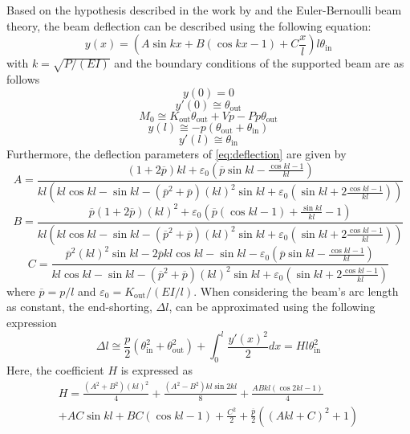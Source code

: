 Based on the hypothesis described in the work by \cite{tivot2021} and the Euler-Bernoulli beam theory, the beam deflection can be described using the following equation:
\begin{equation}\label{eq:deflection}
  y(x) = \left(A\sin{kx}+B(\cos{kx}-1)+C\frac{x}{l}\right) l {\theta }_\textrm{in}
\end{equation}
with $k=\sqrt{P/(EI)}$ and the boundary conditions of the supported beam are as follows
\[y(0)=0\]
\[y'(0)\cong{\theta }_\textrm{out}\]
\[M_0\cong K_\textrm{out}\theta_\textrm{out}+Vp-Pp\theta_\textrm{out}\]
\[y(l)\cong -p(\theta_\textrm{out}+\theta_\textrm{in})\]
\[y'(l)\cong \theta_\textrm{in}\]
Furthermore, the deflection parameters of \cref{eq:deflection} are given by
\begin{equation}\label{A_norm}
A =    \frac{(1+2\overline{p})kl+{\varepsilon }_0\left(\overline{p}  \sin{kl}-\frac{\cos{kl}-1}{kl}\right)}
{kl\left( kl \cos{kl}-\sin{kl}-\left({\overline{p}}^2+\overline{p}\right){(kl)}^2\sin{kl}+{\varepsilon }_0\left(\sin{kl}+2\frac{\cos{kl}-1}{kl}\right)\right)}
\end{equation}
\begin{equation} \label{B_norm}
B = \frac{  \overline{p}(1+2\overline{p}){(kl)}^2+{\varepsilon }_0 \left(\overline{p} \left(\cos{kl}-1\right) + \frac{\sin{kl}}{kl} -1\right)}
{kl\left( kl \cos{kl}-\sin{kl}-\left({\overline{p}}^2+\overline{p}\right){(kl)}^2\sin{kl}+{\varepsilon }_0\left(\sin{kl}+2\frac{\cos{kl}-1}{kl}\right)\right)}
\end{equation}
\begin{equation} \label{C_norm}
C = \frac{  {\overline{p}}^2{(kl)}^2\sin{kl} -2\overline{p} kl\cos{kl} -\sin{kl} - {\varepsilon }_0\left(\overline{p}\sin{kl}-\frac{\cos{kl}-1}{kl}\right)}
{ kl \cos{kl}-\sin{kl}-\left({\overline{p}}^2+\overline{p}\right){(kl)}^2\sin{kl}+{\varepsilon }_0\left(\sin{kl}+2\frac{\cos{kl}-1}{kl}\right)}
\end{equation}
where $\overline{p} = p/l $ and $\varepsilon_0=K_\textrm{out}/(EI/l)$. When considering the beam’s arc length as constant, the end-shorting, $\Delta l$, can be approximated using the following expression
\begin{equation}\label{eq:delta_l}
 \Delta l\cong \frac{p}{2}({\theta }^2_\textrm{in}+\theta ^2_\textrm{out})+\int^l_0{\frac{y'(x)^2}{2}dx}=H l{\theta }^2_\textrm{in}
\end{equation}
Here, the coefficient $H$ is expressed as
\begin{multline}\label{eq:H-smabb}
 H = \frac{\left({A}^2+{B}^2\right){\left(kl\right)}^2}{4} + \frac{\left({A}^2-{B}^2\right)kl\sin{2kl} }{8} + \frac{AB kl\left(\cos{2kl}-1\right)}{4}\\
 +AC\sin{kl} + BC\left(\cos{kl}-1\right) + \frac{{C}^2}{2} +\frac{\overline{p}}{2}\left({\left( Akl+C\right)}^2+1\right)
\end{multline}

